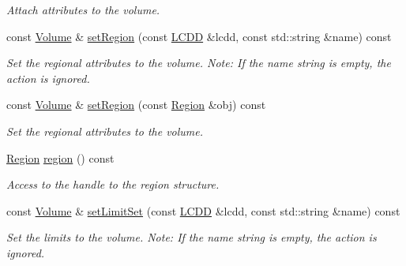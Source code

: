 \begin{DoxyCompactItemize}
\begin{DoxyCompactList}\small\item\em Attach attributes to the volume. \item\end{DoxyCompactList}\item 
const \hyperlink{class_d_d4hep_1_1_geometry_1_1_volume}{Volume} \& \hyperlink{class_d_d4hep_1_1_geometry_1_1_volume_a4070385330a1c5200adaaa13ef4e6547}{setRegion} (const \hyperlink{class_d_d4hep_1_1_geometry_1_1_l_c_d_d}{LCDD} \&lcdd, const std::string \&name) const 
\begin{DoxyCompactList}\small\item\em Set the regional attributes to the volume. Note: If the name string is empty, the action is ignored. \item\end{DoxyCompactList}\item 
const \hyperlink{class_d_d4hep_1_1_geometry_1_1_volume}{Volume} \& \hyperlink{class_d_d4hep_1_1_geometry_1_1_volume_a9078b71f780beef0718462d48c0fda0f}{setRegion} (const \hyperlink{class_d_d4hep_1_1_geometry_1_1_region}{Region} \&obj) const 
\begin{DoxyCompactList}\small\item\em Set the regional attributes to the volume. \item\end{DoxyCompactList}\item 
\hyperlink{class_d_d4hep_1_1_geometry_1_1_region}{Region} \hyperlink{class_d_d4hep_1_1_geometry_1_1_volume_a849db64ccfd2670fd485593f67ae2bb3}{region} () const 
\begin{DoxyCompactList}\small\item\em Access to the handle to the region structure. \item\end{DoxyCompactList}\item 
const \hyperlink{class_d_d4hep_1_1_geometry_1_1_volume}{Volume} \& \hyperlink{class_d_d4hep_1_1_geometry_1_1_volume_a5c4e1991240829fbf7de49a281984550}{setLimitSet} (const \hyperlink{class_d_d4hep_1_1_geometry_1_1_l_c_d_d}{LCDD} \&lcdd, const std::string \&name) const 
\begin{DoxyCompactList}\small\item\em Set the limits to the volume. Note: If the name string is empty, the action is ignored. \item\end{DoxyCompactList}\item 

\end{DoxyCompactItemize}
